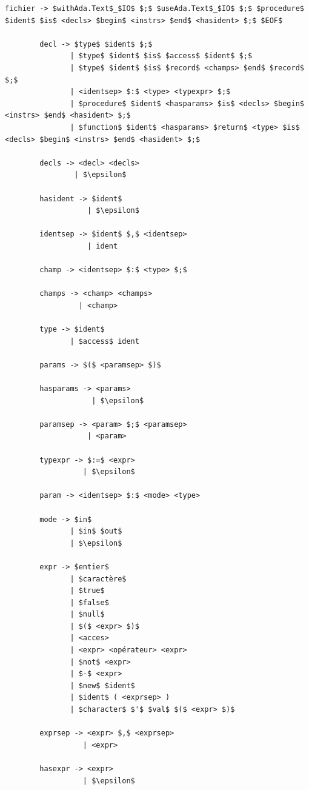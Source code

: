 \documentclass[french,a4paper]{article}
\begin{document}
    \begin{lstlisting}[label={lst:lstlisting}]
        fichier -> $withAda.Text$_$IO$ $;$ $useAda.Text$_$IO$ $;$ $procedure$ $ident$ $is$ <decls> $begin$ <instrs> $end$ <hasident> $;$ $EOF$

        decl -> $type$ $ident$ $;$
               | $type$ $ident$ $is$ $access$ $ident$ $;$
               | $type$ $ident$ $is$ $record$ <champs> $end$ $record$ $;$
               | <identsep> $:$ <type> <typexpr> $;$
               | $procedure$ $ident$ <hasparams> $is$ <decls> $begin$ <instrs> $end$ <hasident> $;$
               | $function$ $ident$ <hasparams> $return$ <type> $is$ <decls> $begin$ <instrs> $end$ <hasident> $;$

        decls -> <decl> <decls>
                | $\epsilon$

        hasident -> $ident$
                   | $\epsilon$

        identsep -> $ident$ $,$ <identsep>
                   | ident

        champ -> <identsep> $:$ <type> $;$

        champs -> <champ> <champs>
                 | <champ>

        type -> $ident$
               | $access$ ident

        params -> $($ <paramsep> $)$

        hasparams -> <params>
                    | $\epsilon$

        paramsep -> <param> $;$ <paramsep>
                   | <param>

        typexpr -> $:=$ <expr>
                  | $\epsilon$

        param -> <identsep> $:$ <mode> <type>

        mode -> $in$
               | $in$ $out$
               | $\epsilon$

        expr -> $entier$
               | $caractère$
               | $true$
               | $false$
               | $null$
               | $($ <expr> $)$
               | <acces>
               | <expr> <opérateur> <expr>
               | $not$ <expr>
               | $-$ <expr>
               | $new$ $ident$
               | $ident$ ( <exprsep> )
               | $character$ $'$ $val$ $($ <expr> $)$

        exprsep -> <expr> $,$ <exprsep>
                  | <expr>

        hasexpr -> <expr>
                  | $\epsilon$


\end{lstlisting}
\end{document}
